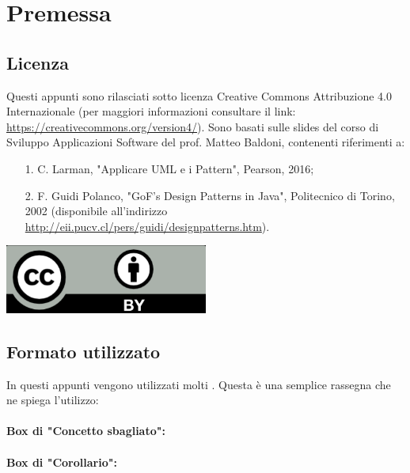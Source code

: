 \chapter{Premessa}

\section{Licenza}

Questi appunti sono rilasciati sotto licenza Creative Commons Attribuzione 4.0 Internazionale (per maggiori
informazioni consultare il link: \href{https://creativecommons.org/version4/}{https://creativecommons.org/version4/}). Sono basati sulle slides del corso di Sviluppo Applicazioni Software del prof. Matteo Baldoni, contenenti riferimenti a:
\begin{itemize}
    \item [1.] C. Larman, "Applicare UML e i Pattern", Pearson, 2016;
    \item [2.] F. Guidi Polanco, "GoF's Design Patterns in Java", Politecnico di Torino, 2002
    (disponibile all'indirizzo \href{http://eii.pucv.cl/pers/guidi/designpatterns.htm}{http://eii.pucv.cl/pers/guidi/designpatterns.htm}).
\end{itemize}

\begin{center}
    \includegraphics[width=0.5\textwidth]{images/cc.png}
\end{center}

\section{Formato utilizzato}

In questi appunti vengono utilizzati molti . Questa è una semplice 
rassegna che ne spiega l'utilizzo:

\subsubsection{Box di "Concetto sbagliato":}


\subsubsection{Box di "Corollario":}

